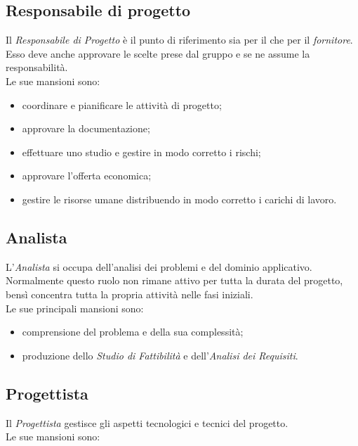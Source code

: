 \documentclass[../NormediProgetto.tex]{subfiles}
\begin{document}
	\subsection {Responsabile di progetto}
	
	Il \textit{Responsabile di Progetto} è il punto di riferimento sia per il  che per il \textit{fornitore}. Esso deve anche approvare le scelte prese dal gruppo e se ne assume la responsabilità. 
	\\ \noindent Le sue mansioni sono:
	
	\begin{itemize}
		\item coordinare e pianificare le attività di progetto;
		\item approvare la documentazione;
		\item effettuare uno studio e gestire in modo corretto i rischi;
		\item approvare l'offerta economica;
		\item gestire le risorse umane distribuendo in modo corretto i carichi di lavoro.
	\end{itemize}
	
	\subsection {Analista}
	
	L'\textit{Analista} si occupa dell'analisi dei problemi e del dominio applicativo. Normalmente questo ruolo non rimane attivo per tutta la durata del progetto, bensì concentra tutta la propria attività nelle fasi iniziali.
	\\ \noindent Le sue principali mansioni sono:
	
	\begin{itemize}
		\item comprensione del problema e della sua complessità;
		\item produzione dello \textit{Studio di Fattibilità} e dell'\textit{Analisi dei Requisiti}.
	\end{itemize}
	
	\subsection {Progettista}
	
	Il \textit{Progettista} gestisce gli aspetti tecnologici e tecnici del progetto.
	\\ \noindent Le sue mansioni sono:
	
\end{document}
